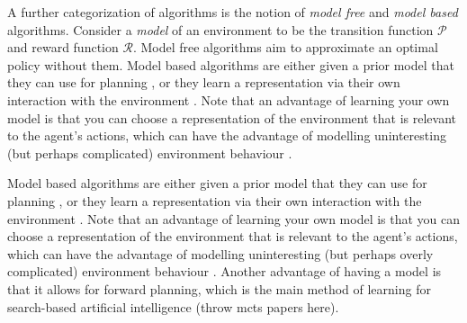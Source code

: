 \documentclass{../main.tex}{}
\begin{document}
A further categorization of algorithms is the notion of \textit{model free} and \textit{model based} algorithms. Consider a \textit{model} of an environment to be the transition function $\mathcal{P}$ and reward function $\mathcal{R}$. Model free algorithms aim to approximate an optimal policy without them. Model based algorithms are either given a prior model that they can use for planning \citep{browne2012survey, Soemers2014}, or they learn a representation via their own interaction with the environment \citep{Sutton1991, Guzdial2017}. Note that an advantage of learning your own model is that you can choose a representation of the environment that is relevant to the agent's actions, which can have the advantage of modelling uninteresting (but perhaps complicated) environment behaviour \citep{Pathak2017}.

Model based algorithms are either given a prior model that they can use for planning \citep{browne2012survey, Soemers2014}, or they learn a representation via their own interaction with the environment \citep{Sutton1991, Guzdial2017, Deisenroth2011}. Note that an advantage of learning your own model is that you can choose a representation of the environment that is relevant to the agent's actions, which can have the advantage of modelling uninteresting (but perhaps overly complicated) environment behaviour \citep{Pathak2017}. Another advantage of having a model is that it allows for forward planning, which is the main method of learning for search-based artificial intelligence (throw mcts papers here).
\end{document}
